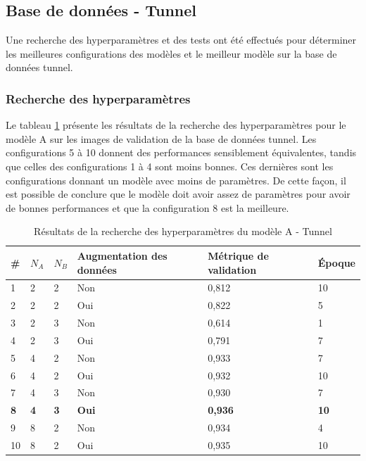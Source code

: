 \subsection{Base de données - Tunnel}
    Une recherche des hyperparamètres et des tests ont été effectués pour déterminer les meilleures configurations des modèles et le meilleur modèle sur la base de données tunnel.

\subsubsection{Recherche des hyperparamètres}
    Le tableau \ref{tab:resultat_tunnel_modele_a} présente les résultats de la recherche des hyperparamètres pour le modèle A sur les images de validation de la base de données tunnel. Les configurations 5 à 10 donnent des performances sensiblement équivalentes, tandis que celles des configurations 1 à 4 sont moins bonnes. Ces dernières sont les configurations donnant un modèle avec moins de paramètres. De cette façon, il est possible de conclure que le modèle doit avoir assez de paramètres pour avoir de bonnes performances et que la configuration 8 est la meilleure.
    \bigskip
    
    \begin{table}
        \centering
        \caption{Résultats de la recherche des hyperparamètres du modèle A - Tunnel}
        \label{tab:resultat_tunnel_modele_a}
        \begin{tabular}{lllp{3cm}p{3cm}l}
            \midrule
            \# & \(N_A\) & \(N_B\) & Augmentation des données & Métrique de validation & Époque\\
            \midrule\midrule
            1  & 2 & 2 & Non & 0,812 & 10\\
            2  & 2 & 2 & Oui & 0,822 & 5\\
            3  & 2 & 3 & Non & 0,614 & 1\\
            4  & 2 & 3 & Oui & 0,791 & 7\\
            5  & 4 & 2 & Non & 0,933 & 7\\
            6  & 4 & 2 & Oui & 0,932 & 10\\
            7  & 4 & 3 & Non & 0,930 & 7\\
            \textbf{8}  & \textbf{4} & \textbf{3} & \textbf{Oui} & \textbf{0,936} & \textbf{10}\\
            9  & 8 & 2 & Non & 0,934 & 4\\
            10 & 8 & 2 & Oui & 0,935 & 10\\
            \midrule
        \end{tabular}
    \end{table}


